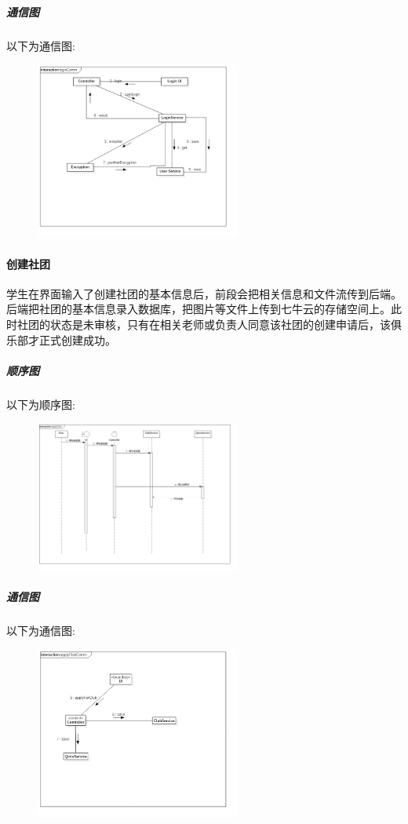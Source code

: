 \documentclass[UTF8]{ctexart}
\begin{document}
\subparagraph*{通信图}
以下为通信图:\\
\begin{figure}[H]
\centering
\includegraphics[width = 0.6\textwidth]{loginComm.jpg}
\end{figure}

\paragraph{创建社团}
学生在界面输入了创建社团的基本信息后，前段会把相关信息和文件流传到后端。后端把社团的基本信息录入数据库，把图片等文件上传到七牛云的存储空间上。此时社团的状态是未审核，只有在相关老师或负责人同意该社团的创建申请后，该俱乐部才正式创建成功。

\subparagraph*{顺序图}
以下为顺序图:\\
\begin{figure}[H]
\centering
\includegraphics[width = 0.6\textwidth]{applyClubSeq.jpg}
\end{figure}

\subparagraph*{通信图}
以下为通信图:\\
\begin{figure}[H]
\centering
\includegraphics[width = 0.6\textwidth]{applyClubComm.jpg}
\end{figure}
\end{document}
